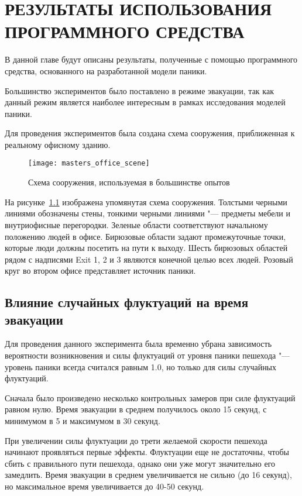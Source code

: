 \chapter{РЕЗУЛЬТАТЫ ИСПОЛЬЗОВАНИЯ ПРОГРАММНОГО СРЕДСТВА}
\label{sec:results}

В данной главе будут описаны результаты, полученные с помощью программного средства,
основанного на разработанной модели паники.

Большинство экспериментов было поставлено в режиме эвакуации, так как данный режим
является наиболее интересным в рамках исследования моделей паники.

Для проведения экспериментов была создана схема сооружения, приближенная к реальному офисному зданию.

\begin{figure}[ht!]
  \centering
  \texttt{[image: masters\_office\_scene]}
  \caption{Схема сооружения, используемая в большинстве опытов}
  \label{sec:results:office_scene}
\end{figure}

На рисунке~\ref{sec:results:office_scene} изображена упомянутая схема сооружения.
Толстыми черными линиями обозначены стены, тонкими черными линиями "--- предметы мебели и внутриофисные перегородки.
Зеленые области соответствуют начальному положению людей в офисе.
Бирюзовые области задают промежуточные точки, которые люди должны посетить на пути к выходу.
Шесть бирюзовых областей рядом с надписями Exit 1, 2 и 3 являются конечной целью всех людей.
Розовый круг во втором офисе представляет источник паники.

\section{Влияние случайных флуктуаций на время эвакуации}
\label{sec:results:fluctuation}

Для проведения данного эксперимента была временно убрана зависимость вероятности возникновения и силы флуктуаций от уровня паники пешехода "---
уровень паники всегда считался равным 1.0, но только для силы случайных флуктуаций.

Сначала было произведено несколько контрольных замеров при силе флуктуаций равном нулю.
Время эвакуации в среднем получилось около 15 секунд, с минимумом в 5 и максимумом в 30 секунд.

При увеличении силы флуктуации до трети желаемой скорости пешехода начинают проявляться первые эффекты.
Флуктуации еще не достаточны, чтобы сбить с правильного пути пешехода, однако они уже могут значительно его замедлить.
Время эвакуации в среднем увеличивается не сильно (до 16 секунд), но максимальное время увеличивается до 40-50 секунд.

